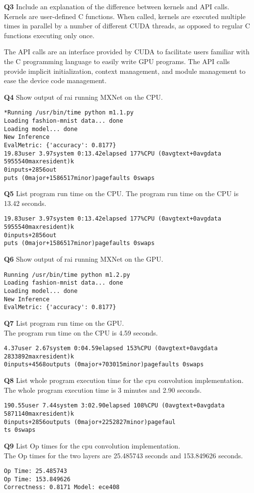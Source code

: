 \documentclass[11pt]{article}
\begin{document}
\textbf{Q3} Include an explanation of the difference between kernels and API calls.\\
Kernels are user-defined C functions. When called, kernels are executed multiple times in parallel by a number of different CUDA threads, as opposed to regular C functions executing only once.

The API calls are an interface provided by CUDA to facilitate users familiar with the C programming language to easily write GPU programs. The API calls provide implicit initialization, context management, and module management to ease the device code management.

\textbf{Q4} Show output of rai running MXNet on the CPU.
\begin{lstlisting}
*Running /usr/bin/time python m1.1.py
Loading fashion-mnist data... done
Loading model... done
New Inference
EvalMetric: {'accuracy': 0.8177}
19.83user 3.97system 0:13.42elapsed 177%CPU (0avgtext+0avgdata 5955540maxresident)k
0inputs+2856out
puts (0major+1586517minor)pagefaults 0swaps
\end{lstlisting}

\textbf{Q5} List program run time on the CPU.
The program run time on the CPU is 13.42 seconds.
\begin{lstlisting}
19.83user 3.97system 0:13.42elapsed 177%CPU (0avgtext+0avgdata 5955540maxresident)k
0inputs+2856out
puts (0major+1586517minor)pagefaults 0swaps
\end{lstlisting}

\textbf{Q6} Show output of rai running MXNet on the GPU.
\begin{lstlisting}
Running /usr/bin/time python m1.2.py
Loading fashion-mnist data... done
Loading model... done
New Inference
EvalMetric: {'accuracy': 0.8177}
\end{lstlisting}
 
\textbf{Q7} List program run time on the GPU.\\
The program run time on the CPU is 4.59 seconds.
\begin{lstlisting}
4.37user 2.67system 0:04.59elapsed 153%CPU (0avgtext+0avgdata 2833892maxresident)k
0inputs+4568outputs (0major+703015minor)pagefaults 0swaps
\end{lstlisting}

\textbf{Q8} List whole program execution time for the cpu convolution implementation.\\
The whole program execution time is 3 minutes and 2.90 seconds. 
\begin{lstlisting}
190.55user 7.44system 3:02.90elapsed 108%CPU (0avgtext+0avgdata 5871140maxresident)k
0inputs+2856outputs (0major+2252827minor)pagefaul
ts 0swaps
\end{lstlisting}

\textbf{Q9} List Op times for the cpu convolution implementation.\\
The Op times for the two layers are 25.485743 seconds and 153.849626 seconds.
\begin{lstlisting}
Op Time: 25.485743
Op Time: 153.849626
Correctness: 0.8171 Model: ece408
\end{lstlisting}
\end{document}
